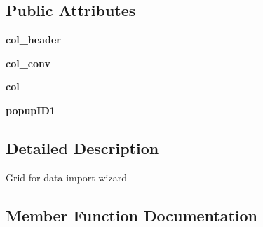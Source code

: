 \subsection*{Public Attributes}
\begin{DoxyCompactItemize}
\item 
\hypertarget{class_uni_dec_1_1unidec__modules_1_1tims__import__wizard_1_1import__wizard__grid_1_1_wizard_grid_a27535e55c70374fe40027522f222647b}{}{\bfseries col\+\_\+header}\label{class_uni_dec_1_1unidec__modules_1_1tims__import__wizard_1_1import__wizard__grid_1_1_wizard_grid_a27535e55c70374fe40027522f222647b}

\item 
\hypertarget{class_uni_dec_1_1unidec__modules_1_1tims__import__wizard_1_1import__wizard__grid_1_1_wizard_grid_aed68d3a4eeffce11350bd39e16624824}{}{\bfseries col\+\_\+conv}\label{class_uni_dec_1_1unidec__modules_1_1tims__import__wizard_1_1import__wizard__grid_1_1_wizard_grid_aed68d3a4eeffce11350bd39e16624824}

\item 
\hypertarget{class_uni_dec_1_1unidec__modules_1_1tims__import__wizard_1_1import__wizard__grid_1_1_wizard_grid_ac9d38d8803ccfc9bc5a410effc99d2f6}{}{\bfseries col}\label{class_uni_dec_1_1unidec__modules_1_1tims__import__wizard_1_1import__wizard__grid_1_1_wizard_grid_ac9d38d8803ccfc9bc5a410effc99d2f6}

\item 
\hypertarget{class_uni_dec_1_1unidec__modules_1_1tims__import__wizard_1_1import__wizard__grid_1_1_wizard_grid_a020eb728ecb3c25f2165b72479f0a553}{}{\bfseries popup\+I\+D1}\label{class_uni_dec_1_1unidec__modules_1_1tims__import__wizard_1_1import__wizard__grid_1_1_wizard_grid_a020eb728ecb3c25f2165b72479f0a553}

\end{DoxyCompactItemize}


\subsection{Detailed Description}
\begin{DoxyVerb}Grid for data import wizard
\end{DoxyVerb}
 

\subsection{Member Function Documentation}
\hypertarget{class_uni_dec_1_1unidec__modules_1_1tims__import__wizard_1_1import__wizard__grid_1_1_wizard_grid_a01e731359ba23e7407ff18121b7cb21f}{}
